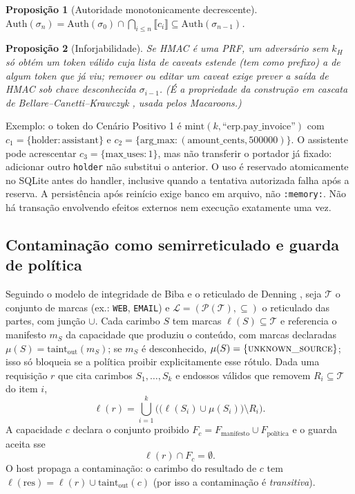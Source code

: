 \documentclass[11pt,a4paper]{article}
\theoremstyle{plain}
\newtheorem{proposicao}{Proposição}
\theoremstyle{definition}
\theoremstyle{remark}
\newcommand{\taint}{\mathrm{taint}}
\newcommand{\cod}[1]{\texttt{#1}}
\begin{document}
\begin{proposicao}[Autoridade monotonicamente decrescente]
$\mathrm{Auth}(\sigma_n)=\mathrm{Auth}(\sigma_0)\cap\bigcap_{i\le n}\llbracket c_i\rrbracket \subseteq \mathrm{Auth}(\sigma_{n-1})$.
\end{proposicao}

\begin{proposicao}[Inforjabilidade]
Se HMAC é uma PRF, um adversário sem $k_H$ só obtém um token válido cuja lista de caveats estende (tem como prefixo) a de algum token que já viu; remover ou editar um caveat exige prever a saída de HMAC sob chave desconhecida $\sigma_{i-1}$. (É a propriedade da construção em cascata de Bellare--Canetti--Krawczyk \cite{cascade}, usada pelos Macaroons.)
\end{proposicao}

Exemplo: o token do Cenário Positivo 1 é $\text{mint}(k,\text{``erp.pay\_invoice''})$ com $c_1=\{\text{holder}:\text{assistant}\}$ e $c_2=\{\text{arg\_max}:(\text{amount\_cents},500000)\}$. O assistente pode acrescentar $c_3=\{\text{max\_uses}:1\}$, mas não transferir o portador já fixado: adicionar outro \cod{holder} não substitui o anterior. O uso é reservado atomicamente no SQLite antes do handler, inclusive quando a tentativa autorizada falha após a reserva. A persistência após reinício exige banco em arquivo, não \cod{:memory:}. Não há transação envolvendo efeitos externos nem execução exatamente uma vez.

\subsection{Contaminação como semirreticulado e guarda de política}

Seguindo o modelo de integridade de Biba e o reticulado de Denning \cite{biba}, seja $\mathcal{T}$ o conjunto de marcas (ex.: \cod{WEB}, \cod{EMAIL}) e $\mathcal{L}=(\mathcal{P}(\mathcal{T}),\subseteq)$ o reticulado das partes, com junção $\cup$. Cada carimbo $S$ tem marcas $\ell(S)\subseteq\mathcal{T}$ e referencia o manifesto $m_S$ da capacidade que produziu o conteúdo, com marcas declaradas $\mu(S)=\taint_{\text{out}}(m_S)$; se $m_S$ é desconhecido, $\mu(S)=\{\textsc{unknown\_source}\}$; isso só bloqueia se a política proibir explicitamente esse rótulo. Dada uma requisição $r$ que cita carimbos $S_1,\dots,S_k$ e endossos válidos que removem $R_i\subseteq\mathcal{T}$ do item $i$,
\begin{equation}
\ell(r)=\bigcup_{i=1}^{k}\Big(\big(\ell(S_i)\cup\mu(S_i)\big)\setminus R_i\Big).
\end{equation}
A capacidade $c$ declara o conjunto proibido $F_c=F_{\text{manifesto}}\cup F_{\text{política}}$ e o guarda aceita sse
\begin{equation}
\ell(r)\cap F_c=\emptyset.
\end{equation}
O host propaga a contaminação: o carimbo do resultado de $c$ tem $\ell(\text{res})=\ell(r)\cup\taint_{\text{out}}(c)$ (por isso a contaminação é \emph{transitiva}).
\end{document}
